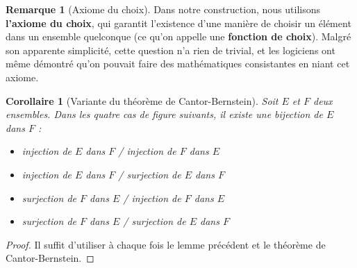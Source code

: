 \documentclass[french]{book}
\theoremstyle{plain}
\newtheorem{cor}{Corollaire}[chapter]
\theoremstyle{definition}
\newtheorem{rmq}{Remarque}[chapter]
\theoremstyle{remark}
\begin{document}
\begin{rmq}[Axiome du choix]
	Dans notre construction, nous utilisons \textbf{l'axiome du choix}, qui garantit l'existence d'une manière de choisir un élément dans un ensemble quelconque (ce qu'on appelle une \textbf{fonction de choix}). Malgré son apparente simplicité, cette question n'a rien de trivial, et les logiciens ont même démontré qu'on pouvait faire des mathématiques consistantes en niant cet axiome.
\end{rmq}
\begin{cor}[Variante du théorème de Cantor-Bernstein]
	Soit $E$ et $F$ deux ensembles. Dans les quatre cas de figure suivants, il existe une bijection de $E$ dans $F$ :
	\begin{itemize}
		\item injection de $E$ dans $F$ / injection de $F$ dans $E$
		\item injection de $E$ dans $F$ / surjection de $E$ dans $F$
		\item surjection de $F$ dans $E$ / injection de $F$ dans $E$
		\item surjection de $F$ dans $E$ / surjection de $E$ dans $F$
	\end{itemize}
\end{cor}
\begin{proof}
	Il suffit d'utiliser à chaque fois le lemme précédent et le théorème de Cantor-Bernstein.
\end{proof}
\end{document}
